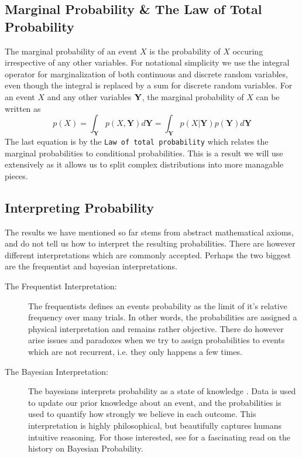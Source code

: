 \subsection{Marginal Probability \& The Law of Total Probability}
The marginal probability of an event $X$ is the probability of $X$ occuring irrespective of any other variables.
For notational simplicity we use the integral operator for marginalization of both continuous and discrete random variables, even though the integral is replaced by a sum for discrete random variables. For an event $X$ and any other variables $\bf Y$, the marginal probability of $X$ can be written as
\begin{equation}
    p(X) = \int_\mathbf{Y} p(X, \mathbf{Y}) d\mathbf{Y} = \int_\mathbf{Y} p(X | \mathbf{Y}) p(\mathbf{Y}) d\mathbf{Y}
\end{equation}
The last equation is by the \texttt{Law of total probability} which relates the marginal probabilities to conditional probabilities. This is a result we will use extensively as it allows us to split complex distributions into more managable pieces.

\subsection{Interpreting Probability}
The results we have mentioned so far stems from abstract mathematical axioms, and do not tell us how to interpret the resulting probabilities. There are however different interpretations which are commonly accepted. Perhaps the two biggest are the frequentist and bayesian interpretations. 

\begin{description}
    \item[The Frequentist Interpretation:] The frequentists defines an events probability as the limit of it's relative frequency over many trials. In other words, the probabilities are assigned a physical interpretation and remains rather objective. There do however arise issues and paradoxes when we try to assign probabilities to events which are not recurrent, i.e. they only happens a few times.
    \item[The Bayesian Interpretation:] The bayesians interprets probability as a state of knowledge \cite{Jaynes86bayesianmethods:}. Data is used to update our prior knowledge about an event, and the probabilities is used to quantify how strongly we believe in each outcome. This interpretation is highly philosophical, but beautifully captures humans intuitive reasoning. For those interested, see \Cite{Jaynes86bayesianmethods:} for a fascinating read on the history on Bayesian Probability.
\end{description}

